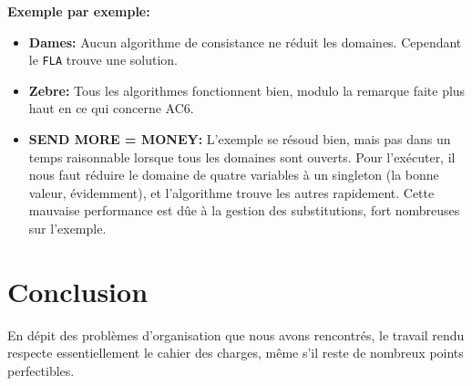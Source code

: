 \documentclass[a4paper,12pt]{article}
\begin{document}
\textbf{Exemple par exemple:}
\begin{itemize}
 \item \textbf{Dames: } Aucun algorithme de consistance ne réduit les domaines. 
    Cependant le \texttt{FLA} trouve une solution.
 \item \textbf{Zebre: } Tous les algorithmes fonctionnent bien, modulo la remarque faite plus haut en ce qui 
    concerne AC6.
 \item \textbf{SEND MORE = MONEY: } L'exemple se résoud bien, mais pas dans un temps raisonnable
  lorsque tous les domaines sont ouverts. Pour l'exécuter, il nous faut réduire le domaine de quatre
  variables à un singleton (la bonne valeur, évidemment), et l'algorithme trouve les autres rapidement.
  Cette mauvaise performance est dûe à la gestion des substitutions, fort nombreuses sur l'exemple.
\end{itemize}

\section{Conclusion}

En dépit des problèmes d'organisation que nous avons rencontrés, 
le travail rendu respecte essentiellement le cahier des charges,
même s'il reste de nombreux points perfectibles.
\end{document}
